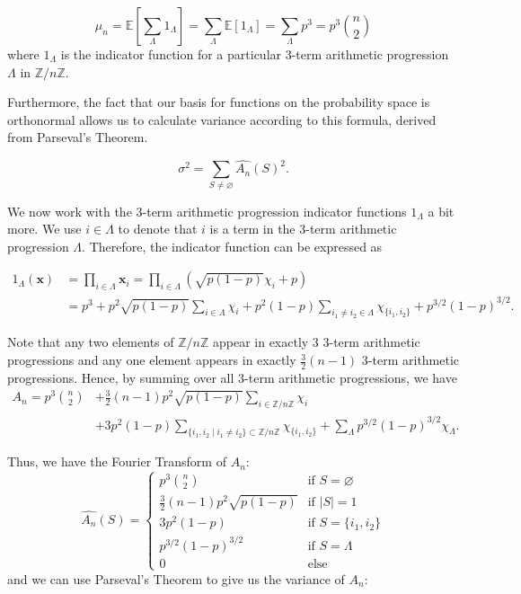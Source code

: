 \documentclass[12pt]{article} %
\newcommand{\p}[1]{\left(#1\right)}
\newcommand{\s}[1]{\left[#1\right]}
\newcommand{\abs}[1]{\left\lvert#1\right\rvert}
\newcommand{\E}{\mathbb{E}}
\newcommand{\Z}{\mathbb{Z}}
\newcommand{\bfx}{\mathbf{x}}
\theoremstyle{definition}
\theoremstyle{definition}
\begin{document}
\[\mu_n = \E\s{\sum_{\Lambda} {1_\Lambda}} = \sum_{\Lambda} {\E[1_\Lambda]} = \sum_{\Lambda} {p^3} = p^3\binom{n}{2}\]
where $1_\Lambda$ is the indicator function for a particular 3-term arithmetic progression $\Lambda$ in $\Z / n\Z$.

Furthermore, the fact that our basis for functions on the probability space is orthonormal allows us to calculate variance according to this formula, derived from Parseval's Theorem.

\[ \sigma^2 = \sum_{S \neq \varnothing} {\hat{A_n}(S)^2}. \]

We now work with the 3-term arithmetic progression indicator functions $1_\Lambda$ a bit more. We use $i \in \Lambda$ to denote that $i$ is a term in the 3-term arithmetic progression $\Lambda$. Therefore, the indicator function can be expressed as

\begin{align*}
1_\Lambda(\bfx) &= \prod_{i \in \Lambda} {\bfx_i} = \prod_{i \in \Lambda} {\p{\sqrt{p(1-p)}\chi_i + p}} \\ 
&= p^3+p^2\sqrt{p(1-p)}\sum_{i \in \Lambda} {\chi_i} + p^2(1-p)\sum_{i_1 \neq i_2 \in \Lambda} {\chi_{\{i_1, i_2\}}} + p^{3/2}(1-p)^{3/2}.
\end{align*}

Note that any two elements of $\Z / n\Z$ appear in exactly 3 3-term arithmetic progressions and any one element appears in exactly $\frac{3}{2}(n-1)$ 3-term arithmetic progressions. Hence, by summing over all 3-term arithmetic progressions, we have
\begin{align*}
A_n = p^3 {{n}\choose{2}} &+ \frac{3}{2}(n-1)p^2\sqrt{p(1-p)}\sum_{i \in \Z / n\Z} \chi_i \\
&+3p^2(1-p)\sum_{\{i_1, i_2 \mid i_1 \neq i_2\} \subset \Z / n\Z} \chi_{\{i_1, i_2 \}} + \sum_{\Lambda} p^{3/2}(1-p)^{3/2}\chi_{\Lambda}.
\end{align*}

Thus, we have the Fourier Transform of $A_n$:
\[\hat{A_n}(S) = \begin{cases} 
      p^3 {{n}\choose{2}} & \text{if } S = \varnothing \\[10pt]
      \frac{3}{2}(n-1)p^2\sqrt{p(1-p)} & \text{if } \abs{S} = 1 \\[10pt]
      3p^2(1-p) & \text{if } S = \{i_1,i_2\} \\[10pt]
      p^{3/2}(1-p)^{3/2} & \text{if } S = \Lambda \\[10pt]
      0 & \text{else}
\end{cases} \]
and we can use Parseval's Theorem to give us the variance of $A_n$:
\end{document}
